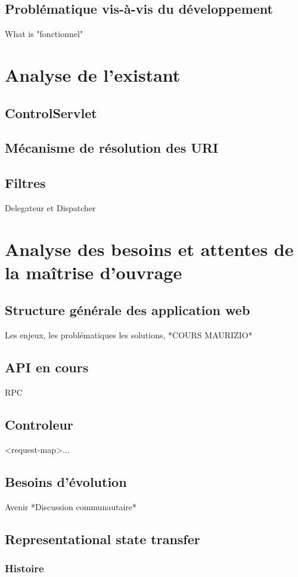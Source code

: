 \subsection{Problématique vis-à-vis du développement}
What is "fonctionnel"

\section{Analyse de l'existant}
\subsection{ControlServlet}
\subsection{Mécanisme de résolution des URI}
\subsection{Filtres}
Delegateur et Dispatcher


\section{Analyse des besoins et attentes de la maîtrise d'ouvrage}
\subsection{Structure générale des application web}
Les enjeux, les problématiques les solutions, *COURS MAURIZIO*
\subsection{API en cours}
RPC
\subsection{Controleur}
<request-map>...
\subsection{Besoins d'évolution}
Avenir
*Discussion communautaire*
\subsection{Representational state transfer}
\subsubsection{Histoire}

